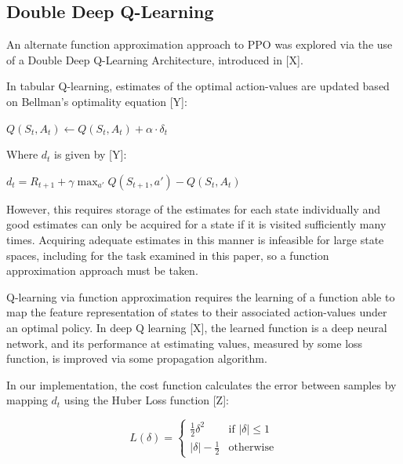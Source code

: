 \documentclass{article}
\begin{document}
    
    \subsection{Double Deep Q-Learning}

        An alternate function approximation approach to PPO was explored via the use of a Double Deep Q-Learning Architecture, introduced in [X].

        In tabular Q-learning, estimates of the optimal action-values are updated based on Bellman's optimality equation [Y]:
        \\
        \begin{center}
        $Q(S_{t}, A_{t}) \leftarrow Q(S_{t}, A_{t}) + \alpha\cdot\delta_{t}$
	\end{center}

        Where $d_{t}$ is given by [Y]:
        
        \begin{center}
        $d_{t} = R_{t+1} + \gamma\max_{a'}Q(S_{t+1}, a') - Q(S_{t}, A_{t})$
	\end{center}
        
        However, this requires storage of the estimates for each state individually and good estimates can only be acquired for a state if it is visited sufficiently many times. Acquiring adequate estimates in this manner is infeasible for large state spaces, including for the task examined in this paper, so a function approximation approach must be taken.

        Q-learning via function approximation requires the learning of a function able to map the feature representation of states to their associated action-values under an optimal policy. In deep Q learning [X], the learned function is a deep neural network, and its performance at estimating values, measured by some loss function, is improved via some propagation algorithm.

        In our implementation, the cost function calculates the error between samples by mapping $d_{t}$ using the Huber Loss function [Z]:
            
        \begin{equation}
        L(\delta)=
            \begin{cases}
                \frac{1}{2}\delta^{2} & \text{if  } |\delta| \leq 1\\
                |\delta| - \frac{1}{2} & \text{otherwise} 
            \end{cases}
        \end{equation}
\end{document}
